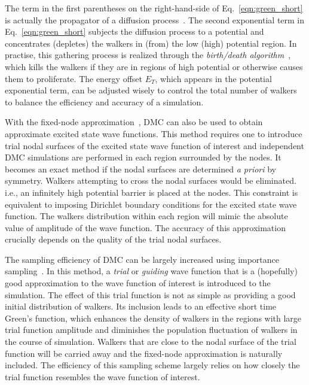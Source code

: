 \documentclass[12pt]{iopart}
\begin{document}
The term in the first parentheses on the right-hand-side of Eq.~\ref{eqn:green_short} is actually the propagator of a diffusion process~\cite{second_course_diffusion}. 
The second exponential term in Eq.~\ref{eqn:green_short} subjects the diffusion process to a potential and concentrates (depletes) the walkers in (from) the low (high) potential region. 
In practise, this gathering process is realized through the {\em birth/death algorithm}~\cite{reynolds_birth-death}, which kills the walkers if they are in regions of high potential or otherwise causes them to proliferate. 
The energy offset $E_T$, which appears in the potential exponential term, can be adjusted wisely to control the total number of walkers to balance the efficiency and accuracy of a simulation.

With the fixed-node approximation~\cite{anderson_fixed_node_75,anderson_fixed_node_76,moskowitz_fixed_node_82}, DMC can also be used to obtain approximate excited state wave functions. 
This method requires one to introduce trial nodal surfaces of the excited state wave function of interest and independent DMC simulations are performed in each region surrounded by the nodes.
It becomes an exact method if the nodal surfaces are determined {\it a priori} by symmetry.
Walkers attempting to cross the nodal surfaces would be eliminated. i.e., an infinitely high potential barrier is placed at the nodes.
This constraint is equivalent to imposing Dirichlet boundary conditions for the excited state wave function. The walkers distribution within each region will mimic the absolute value of amplitude of the wave function. The accuracy of this approximation crucially depends on the quality of the trial nodal surfaces.

The sampling efficiency of DMC can be largely increased using importance sampling~\cite{grimm_isdmc,ceperley_isdmc}. 
In this method, a {\em trial} or {\em guiding} wave function that is a (hopefully) good approximation to the wave function of interest is introduced to the simulation. 
The effect of this trial function is not as simple as providing a good initial distribution of walkers. 
Its inclusion leads to an effective short time Green's function, which enhances the density of walkers in the regions with large trial function amplitude and diminishes the population fluctuation of walkers in the course of simulation. Walkers that are close to the nodal surface of the trial function will be carried away and the fixed-node approximation is naturally included. The efficiency of this sampling scheme largely relies on how closely the trial function resembles the wave function of interest.
\end{document}
